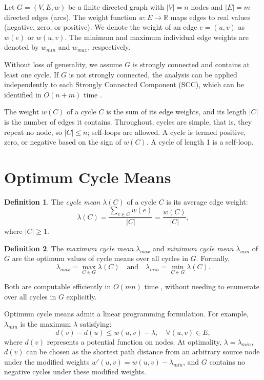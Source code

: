 \documentclass{article}
\theoremstyle{definition}
\newtheorem{defn}{Definition}[section]
\begin{document}
Let $G = (V, E, w)$ be a finite directed graph with $|V| = n$ nodes
and $|E| = m$ directed edges (arcs). The weight function $w: E \to
\mathbb{R}$ maps edges to real values (negative, zero, or
positive). We denote the weight of an edge $e=(u,v)$ as $w(e)$ or
$w(u,v)$. The minimum and maximum individual edge weights are denoted
by $w_{min}$ and $w_{max}$, respectively.

Without loss of generality, we assume $G$ is strongly connected and
contains at least one cycle. If $G$ is not strongly connected, the
analysis can be applied independently to each Strongly Connected
Component (SCC), which can be identified in $O(n+m)$ time
\citep{MeSa08}.

The weight $w(C)$ of a cycle $C$ is the sum of its edge weights, and
its length $|C|$ is the number of edges it contains. Throughout,
cycles are simple, that is, they repeat no node, so $|C| \leq n$;
self-loops are allowed. A cycle is termed positive, zero, or negative
based on the sign of $w(C)$. A cycle of length 1 is a self-loop.

\section{Optimum Cycle Means}
\label{sec:opt-means}

\begin{defn}
  \label{def:means}
The \textit{cycle mean} $\lambda(C)$ of a cycle $C$ is its average
edge weight:
\begin{equation}
  \label{eq:means}
  \lambda(C) = \frac{\sum\limits_{e\in C} w(e)}{|C|} = \frac{w(C)}{|C|},
\end{equation}
where $|C| \geq 1$.
\end{defn}

\begin{defn}
  \label{def:opt-means}
The \textit{maximum cycle mean} $\lambda_{max}$ and \textit{minimum
  cycle mean} $\lambda_{min}$ of $G$ are the optimum values of cycle
means over all cycles in $G$. Formally,
\begin{equation}
  \label{eq:opt-means}
  \lambda_{max} = \max\limits_{C\in G} \lambda(C) \quad \text{and}
  \quad \lambda_{min} = \min\limits_{C\in G} \lambda(C).
\end{equation}
\end{defn}
Both are computable efficiently in $O(mn)$ time \citep{Da04}, without
needing to enumerate over all cycles in $G$ explicitly.

Optimum cycle means admit a linear programming formulation. For
example, $\lambda_{min}$ is the maximum $\lambda$ satisfying:
\begin{equation}
  d(v) - d(u) \leq w(u,v) - \lambda, \quad \forall (u,v) \in E,
\end{equation}
where $d(v)$ represents a potential function on nodes. At optimality,
$\lambda=\lambda_{min}$, $d(v)$ can be chosen as the shortest path
distance from an arbitrary source node under the modified weights
$w'(u,v)=w(u,v) - \lambda_{min}$, and $G$ contains no negative cycles
under these modified weights.
\end{document}
